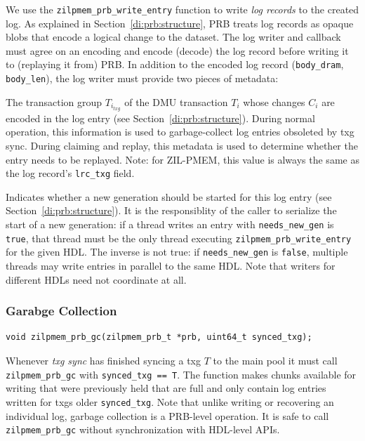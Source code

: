 \documentclass[12pt,a4paper,twoside]{book}
\begin{document}
We use the \lstinline{zilpmem_prb_write_entry} function to write \textit{log records} to the created log.
As explained in Section~\ref{di:prb:structure}, PRB treats log records as opaque blobs that encode a logical change to the dataset.
The log writer and callback must agree on an encoding and encode (decode) the log record before writing it to (replaying it from) PRB.
In addition to the encoded log record (\lstinline{body_dram}, \lstinline{body_len}), the log writer must provide two pieces of metadata:
\begin{description}[noitemsep,leftmargin=1.5cm,labelindent=1cm]
    \item[txg] The transaction group $T_{i_{txg}}$ of the DMU transaction $T_i$ whose changes $C_i$ are encoded in the log entry (see Section~\ref{di:prb:structure}).
        During normal operation, this information is used to garbage-collect log entries obsoleted by txg sync.
        During claiming and replay, this metadata is used to determine whether the entry needs to be replayed.
        Note: for ZIL-PMEM, this value is always the same as the log record's \lstinline{lrc_txg} field.
    \item[needs\_new\_gen] Indicates whether a new generation should be started for this log entry (see Section~\ref{di:prb:structure}).
        It is the responsiblity of the caller to serialize the start of a new generation:
        if a thread writes an entry with \lstinline{needs_new_gen} is \lstinline{true}, that thread must be the only thread executing \lstinline{zilpmem_prb_write_entry} for the given HDL.
        The inverse is not true: if \lstinline{needs_new_gen} is \lstinline{false}, multiple threads may write entries in parallel to the same HDL.
        Note that writers for different HDLs need not coordinate at all.
\end{description}

\subsubsection{Garabge Collection}

\begin{lstlisting}
void zilpmem_prb_gc(zilpmem_prb_t *prb, uint64_t synced_txg);
\end{lstlisting}

Whenever \textit{txg sync} has finished syncing a txg $T$ to the main pool it must call \lstinline{zilpmem_prb_gc} with \lstinline{synced_txg == T}.
The function makes chunks available for writing that were previously held that are full and only contain log entries written for txgs older \lstinline{synced_txg}.
Note that unlike writing or recovering an individual log, garbage collection is a PRB-level operation.
It is safe to call \lstinline{zilpmem_prb_gc} without synchronization with HDL-level APIs.
\end{document}

